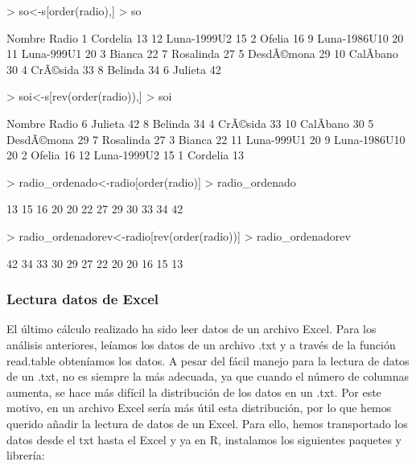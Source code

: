 \documentclass [a4paper] {article}
\begin{document}
\begin{Schunk}
\begin{Sinput}
> so<-s[order(radio),]
> so
\end{Sinput}
\begin{Soutput}
         Nombre Radio
1      Cordelia    13
12  Luna-1999U2    15
2        Ofelia    16
9  Luna-1986U10    20
11   Luna-999U1    20
3        Bianca    22
7     Rosalinda    27
5    DesdÃ©mona    29
10    CalÃ­bano    30
4      CrÃ©sida    33
8       Belinda    34
6       Julieta    42
\end{Soutput}
\begin{Sinput}
> soi<-s[rev(order(radio)),]
> soi
\end{Sinput}
\begin{Soutput}
         Nombre Radio
6       Julieta    42
8       Belinda    34
4      CrÃ©sida    33
10    CalÃ­bano    30
5    DesdÃ©mona    29
7     Rosalinda    27
3        Bianca    22
11   Luna-999U1    20
9  Luna-1986U10    20
2        Ofelia    16
12  Luna-1999U2    15
1      Cordelia    13
\end{Soutput}
\begin{Sinput}
> radio_ordenado<-radio[order(radio)]
> radio_ordenado
\end{Sinput}
\begin{Soutput}
 [1] 13 15 16 20 20 22 27 29 30 33 34 42
\end{Soutput}
\begin{Sinput}
> radio_ordenadorev<-radio[rev(order(radio))]
> radio_ordenadorev
\end{Sinput}
\begin{Soutput}
 [1] 42 34 33 30 29 27 22 20 20 16 15 13
\end{Soutput}
\end{Schunk}

\subsubsection{Lectura datos de Excel}
El último cálculo realizado ha sido leer datos de un archivo Excel. Para los análisis anteriores, leíamos los
datos de un archivo .txt y a través de la función read.table obteníamos los datos. A pesar del fácil manejo para 
la lectura de datos de un .txt, no es siempre la más adecuada, ya que cuando el número de columnas aumenta,
se hace más difícil la distribución de los datos en un .txt. Por este motivo, en un archivo Excel sería más 
útil esta distribución, por lo que hemos querido añadir la lectura de datos de un Excel.
Para ello, hemos transportado los  datos desde el txt hasta el Excel y 
ya en R, instalamos los siguientes paquetes y librería:
\end{document}
